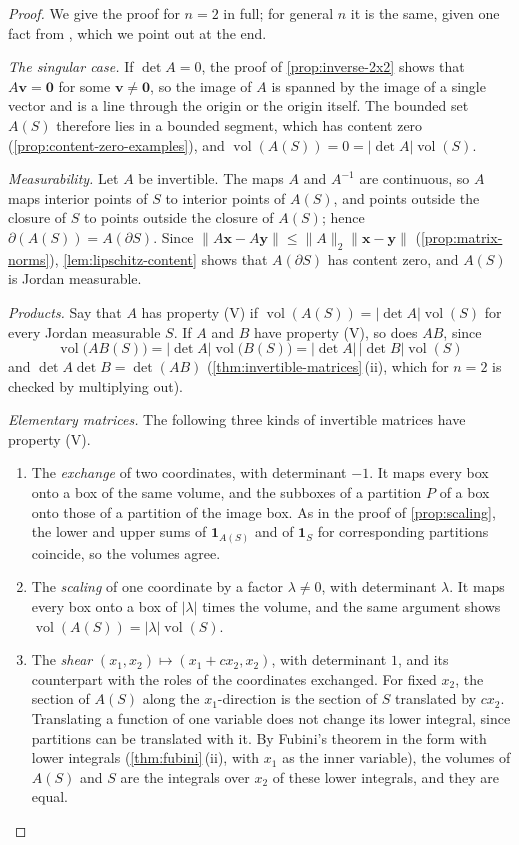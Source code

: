 \begin{proof}
We give the proof for $n=2$ in full; for general $n$ it is the same, given one fact from , which we point out at the end.

\emph{The singular case.} If $\det A=0$, the proof of \cref{prop:inverse-2x2} shows that $A\mathbf v=\mathbf0$ for some $\mathbf v\ne\mathbf0$, so the image of $A$ is spanned by the image of a single vector and is a line through the origin or the origin itself. The bounded set $A(S)$ therefore lies in a bounded segment, which has content zero (\cref{prop:content-zero-examples}), and $\operatorname{vol}(A(S))=0=|\det A|\operatorname{vol}(S)$.

\emph{Measurability.} Let $A$ be invertible. The maps $A$ and $A^{-1}$ are continuous, so $A$ maps interior points of $S$ to interior points of $A(S)$, and points outside the closure of $S$ to points outside the closure of $A(S)$; hence $\partial(A(S))=A(\partial S)$. Since $\|A\mathbf x-A\mathbf y\|\le\|A\|_2\|\mathbf x-\mathbf y\|$ (\cref{prop:matrix-norms}), \cref{lem:lipschitz-content} shows that $A(\partial S)$ has content zero, and $A(S)$ is Jordan measurable.

\emph{Products.} Say that $A$ has property (V) if $\operatorname{vol}(A(S))=|\det A|\operatorname{vol}(S)$ for every Jordan measurable $S$. If $A$ and $B$ have property (V), so does $AB$, since
\[
\operatorname{vol}\bigl(AB(S)\bigr)=|\det A|\operatorname{vol}\bigl(B(S)\bigr)=|\det A|\,|\det B|\operatorname{vol}(S)
\]
and $\det A\det B=\det(AB)$ (\cref{thm:invertible-matrices}\,(ii), which for $n=2$ is checked by multiplying out).

\emph{Elementary matrices.} The following three kinds of invertible matrices have property (V).
\begin{enumerate}
\item The \emph{exchange} of two coordinates, with determinant $-1$. It maps every box onto a box of the same volume, and the subboxes of a partition $P$ of a box onto those of a partition of the image box. As in the proof of \cref{prop:scaling}, the lower and upper sums of $\mathbf 1_{A(S)}$ and of $\mathbf 1_S$ for corresponding partitions coincide, so the volumes agree.
\item The \emph{scaling} of one coordinate by a factor $\lambda\ne0$, with determinant $\lambda$. It maps every box onto a box of $|\lambda|$ times the volume, and the same argument shows $\operatorname{vol}(A(S))=|\lambda|\operatorname{vol}(S)$.
\item The \emph{shear} $(x_1,x_2)\mapsto(x_1+cx_2,x_2)$, with determinant $1$, and its counterpart with the roles of the coordinates exchanged. For fixed $x_2$, the section of $A(S)$ along the $x_1$-direction is the section of $S$ translated by $cx_2$. Translating a function of one variable does not change its lower integral, since partitions can be translated with it. By Fubini's theorem in the form with lower integrals (\cref{thm:fubini}\,(ii), with $x_1$ as the inner variable), the volumes of $A(S)$ and $S$ are the integrals over $x_2$ of these lower integrals, and they are equal.
\end{enumerate}


\end{proof}
